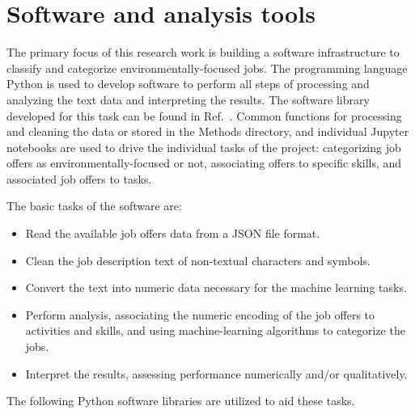 \section{Software and analysis tools}
\label{sec:software}
The primary focus of this research work is building a software infrastructure to classify and categorize environmentally-focused jobs. The programming language Python is used to develop software to perform all steps of processing and analyzing the text data and interpreting the results. The software library developed for this task can be found in Ref.~\cite{emilysharata}. Common functions for processing and cleaning the data or stored in the Methods directory, and individual Jupyter notebooks are used to drive the individual tasks of the project: categorizing job offers as environmentally-focused or not, associating offers to specific skills, and associated job offers to tasks.

The basic tasks of the software are:

\begin{itemize}
\item Read the available job offers data from a JSON file format.

\item Clean the job description text of non-textual characters and symbols.

\item Convert the text into numeric data necessary for the machine learning tasks.

\item Perform analysis, associating the numeric encoding of the job offers to activities and skills, and using machine-learning algorithms to categorize the jobs.

\item Interpret the results, assessing performance numerically and/or qualitatively.
\end{itemize}

The following Python software libraries are utilized to aid these tasks.

